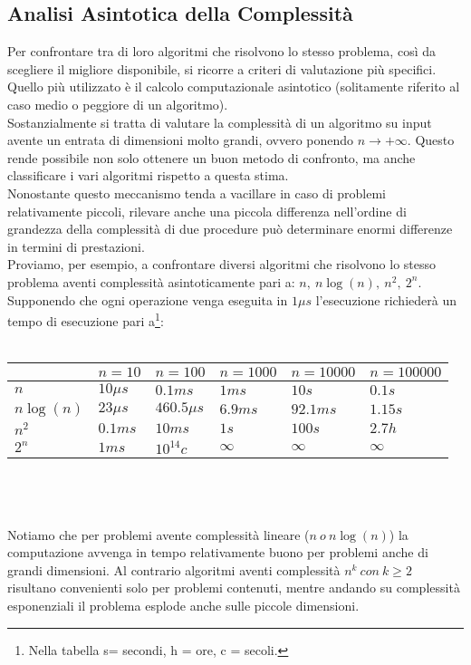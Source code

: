 \subsection{Analisi Asintotica della Complessità}
Per confrontare tra di loro algoritmi che risolvono lo stesso problema, così da scegliere il migliore disponibile, si ricorre a criteri di valutazione più specifici. Quello più utilizzato è il calcolo computazionale asintotico (solitamente riferito al caso medio o peggiore di un algoritmo).\\
Sostanzialmente si tratta di valutare la complessità di un algoritmo su input avente un entrata di dimensioni molto grandi, ovvero ponendo $n \rightarrow +\infty$. Questo rende possibile non solo ottenere un buon metodo di confronto, ma anche classificare i vari algoritmi rispetto a questa stima.\\
Nonostante questo meccanismo tenda a vacillare in caso di problemi relativamente piccoli, rilevare anche una piccola differenza nell'ordine di grandezza della complessità di due procedure può determinare enormi differenze in termini di prestazioni.\\
Proviamo, per esempio, a confrontare diversi algoritmi che risolvono lo stesso problema aventi complessità asintoticamente pari a: $n, \ n\log(n), \ n^2, \ 2^n$. Supponendo che ogni operazione venga eseguita in $1\mu s$ l'esecuzione richiederà un tempo di esecuzione pari a\footnote{Nella tabella s= secondi, h = ore, c = secoli.}:
\\
\\
\label{my-label}
\begin{tabular}{|l|l|l|l|l|l|}
\hline
			& $n=10$     & $n=100$       	& $n=1000$      & $n=10000$  & $n=100000$  \\   \hline
$n$   		& $10\mu s$  & $0.1 ms$      	&  $1ms$      	& $10s$  	 & $0.1s$      \\	\hline
$n\log(n)$  & $23\mu s$  & $460.5 \mu s$    &  $6.9 ms$     & $92.1 ms$  & $1.15 s$    \\	\hline
$n^2$ 		& $0.1ms$    & $10ms$        	&  $1s$         & $100s$     & $2.7h$      \\	\hline
$2^n$		& $1ms$      & $ 10^{14} c$     &  $\infty$     & $\infty$   & $\infty$    \\   \hline
\end{tabular}
\\ 
\\ 
\\ 
Notiamo che per problemi avente complessità lineare ($n \ o \ n\log(n)$) la computazione avvenga in tempo relativamente buono per problemi anche di grandi dimensioni. Al contrario algoritmi aventi complessità $n^k \ con \ k \geq 2 $ risultano convenienti solo per problemi contenuti, mentre andando su complessità esponenziali il problema esplode anche sulle piccole dimensioni. 
